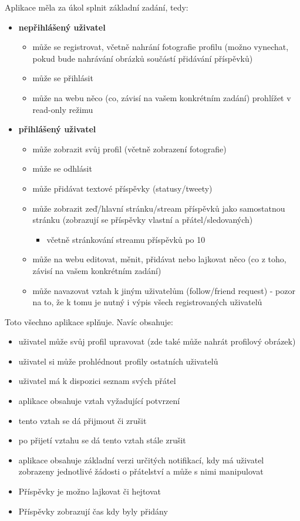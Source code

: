 \documentclass[
12pt,
a4paper,
pdftex,
czech,
titlepage
]{report}
\begin{document}
Aplikace měla za úkol splnit základní zadání, tedy:
\begin{itemize}
\item \textbf{nepřihlášený uživatel}
\begin{itemize}
\item může se registrovat, včetně nahrání fotografie profilu (možno vynechat, pokud bude nahrávání obrázků součástí přidávání příspěvků)
\item může se přihlásit
\item může na webu něco (co, závisí na vašem konkrétním zadání) prohlížet v read-only režimu
\end{itemize}
\item \textbf{přihlášený uživatel}
\begin{itemize}
\item může zobrazit svůj profil (včetně zobrazení fotografie)
\item může se odhlásit
\item může přidávat textové příspěvky (statusy/tweety)
\item může zobrazit zeď/hlavní stránku/stream příspěvků jako samostatnou stránku (zobrazují se příspěvky vlastní a přátel/sledovaných)
\begin{itemize}
\item včetně stránkování streamu příspěvků po 10
\end{itemize}
\item může na webu editovat, měnit, přidávat nebo lajkovat něco (co z toho, závisí na vašem konkrétním zadání)
\item může navazovat vztah k jiným uživatelům (follow/friend request) - pozor na to, že k tomu je nutný i výpis všech registrovaných uživatelů
\end{itemize}

\end{itemize}

Toto všechno aplikace splňuje. Navíc obsahuje:

\begin{itemize}
\item uživatel může svůj profil upravovat (zde také může nahrát profilový obrázek)
\item uživatel si může prohlédnout profily ostatních uživatelů
\item uživatel má k dispozici seznam svých přátel
\item aplikace obsahuje vztah vyžadující potvrzení
\item tento vztah se dá přijmout či zrušit
\item po přijetí vztahu se dá tento vztah stále zrušit
\item aplikace obsahuje základní verzi určitých notifikací, kdy má uživatel zobrazeny jednotlivé žádosti o přátelství a může s nimi manipulovat
\item Příspěvky je možno lajkovat či hejtovat
\item Příspěvky zobrazují čas kdy byly přidány
\end{itemize}
\end{document}
